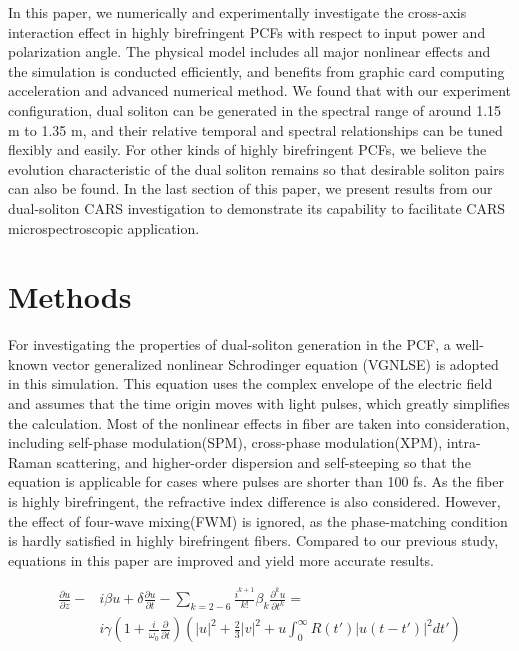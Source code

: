 \documentclass{osa-article}
\begin{document}
In this paper, we numerically and experimentally investigate the cross-axis interaction effect in highly birefringent PCFs with respect to input power and polarization angle. The physical model includes all major nonlinear effects and the simulation is conducted efficiently, and benefits from graphic card computing acceleration and advanced numerical method. We found that with our experiment configuration, dual soliton can be generated in the spectral range of around 1.15 \textmu m to 1.35 \textmu m, and their relative temporal and spectral relationships can be tuned flexibly and easily. For other kinds of highly birefringent PCFs, we believe the evolution characteristic of the dual soliton remains so that desirable soliton pairs can also be found. In the last section of this paper, we present results from our dual-soliton CARS investigation to demonstrate its capability to facilitate CARS microspectroscopic application. 
\section{Methods}

For investigating the properties of dual-soliton generation in the PCF, a well-known vector generalized nonlinear Schrodinger equation (VGNLSE)\cite{husakou_supercontinuum_2001,agrawal_nonlinear_2013} is adopted in this simulation. This equation uses the complex envelope of the electric field and assumes that the time origin moves with light pulses, which greatly simplifies the calculation. Most of the nonlinear effects in fiber are taken into consideration, including self-phase modulation(SPM), cross-phase modulation(XPM), intra-Raman scattering, and higher-order dispersion and self-steeping so that the equation is applicable for cases where pulses are shorter than 100 fs\cite{agrawal_nonlinear_2013}. As the fiber is highly birefringent, the refractive index difference is also considered. However, the effect of four-wave mixing(FWM) is ignored, as the phase-matching condition is hardly satisfied in highly birefringent fibers. Compared to our previous study\cite{chen_dual-soliton_2016}, equations in this paper are improved and yield more accurate results.  

\begin{equation}
\begin{split}
\frac{\partial u}{\partial z} - & i\beta u + \delta \frac{\partial u}{\partial t}-\sum_{k=2-6}\frac{i^{k+1}}{k!}\beta_k\frac{\partial^k u}{\partial t^k} =\\
 & i\gamma\left(1+\frac{i}{\omega_0}\frac{\partial}{\partial t}\right)\left(|u|^2+\frac{2}{3}|v|^2+u\int_0^\infty{R(t')|u(t-t')|^2dt'} \right)
\label{eq1}
\end{split}
\end{equation}
\end{document}
